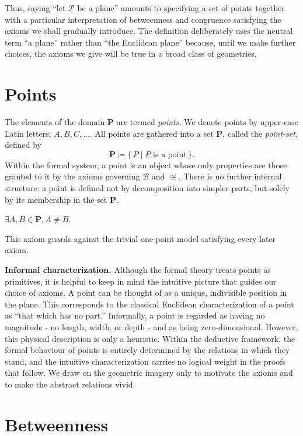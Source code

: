 \documentclass[../../../main/main.tex]{subfiles}
\begin{document}
\noindent
Thus, saying ``let \(\mathcal{P}\) be a plane'' amounts to specifying a set of points together with a particular interpretation of betweenness and congruence satisfying the axioms we shall gradually introduce.
The definition deliberately uses the neutral term ``a plane'' rather than ``the Euclidean plane'' because, until we make further choices, the axioms we give will be true in a broad class of geometries.

\section{Points}

The elements of the domain $\mathbf{P}$ are termed \textit{points}.
We denote points by upper-case Latin letters: \(A, B, C, \dots\).
All points are gathered into a set $\mathbf{P}$, called the \textit{point-set}, defined by
\[
\mathbf{P} \coloneqq \{\, P \mid P \text{ is a point} \,\}.
\]
Within the formal system, a point is an object whose only properties are those granted to it by the axioms governing \(\mathcal{B}\) and \(\cong\).
There is no further internal structure: a point is defined not by decomposition into simpler parts, but solely by its membership in the set \(\mathbf{P}\).

\begin{axiom}\label{ax:existence}
    $\exists A,B \in \mathbf{P}, A \neq B.$
\end{axiom}

This axiom guards against the trivial one-point model satisfying every later axiom.

\medskip
\noindent\textbf{Informal characterization.}
Although the formal theory treats points as primitives, it is helpful to keep in mind the intuitive picture that guides our choice of axioms.
A point can be thought of as a unique, indivisible position in the plane.
This corresponds to the classical Euclidean characterization of a point as ``that which has no part.''
Informally, a point is regarded as having no magnitude - no length, width, or depth - and as being zero-dimensional.
However, this physical description is only a heuristic.
Within the deductive framework, the formal behaviour of points is entirely determined by the relations in which they stand, and the intuitive characterization carries no logical weight in the proofs that follow.
We draw on the geometric imagery only to motivate the axioms and to make the abstract relations vivid.

\section{Betweenness}
\end{document}
